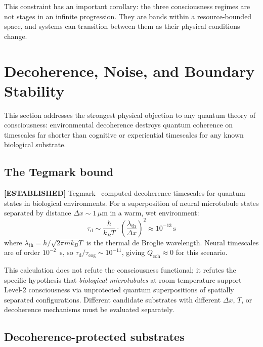 \documentclass[12pt,letterpaper]{article}
\newcommand{\ESTABLISHED}[1]{\textcolor{green!50!black}{\textbf{[ESTABLISHED]}} #1}
\newcommand{\Qcoh}{Q_{\mathrm{coh}}}
\newcommand{\taud}{\tau_{\mathrm{d}}}
\newcommand{\taucog}{\tau_{\mathrm{cog}}}
\begin{document}
This constraint has an important corollary: the three consciousness regimes
are not stages in an infinite progression. They are bands within a
resource-bounded space, and systems can transition between them as their
physical conditions change.

\section{Decoherence, Noise, and Boundary Stability}
\label{sec:decoherence}

This section addresses the strongest physical objection to any quantum theory
of consciousness: environmental decoherence destroys quantum coherence on
timescales far shorter than cognitive or experiential timescales for any
known biological substrate.

\subsection{The Tegmark bound}
\label{sec:tegmark}

\ESTABLISHED{} Tegmark~\cite{Tegmark2000} computed decoherence timescales for
quantum states in biological environments. For a superposition of neural
microtubule states separated by distance $\Delta x \sim 1\,\mu$m in a warm,
wet environment:
\begin{equation}
  \taud \sim \frac{\hbar}{k_B T} \cdot \left(\frac{\lambda_{\mathrm{th}}}{\Delta x}\right)^2
  \approx 10^{-13}\,\mathrm{s}
  \label{eq:tegmark_bound}
\end{equation}
where $\lambda_{\mathrm{th}} = h/\sqrt{2\pi m k_B T}$ is the thermal de
Broglie wavelength. Neural timescales are of order $10^{-2}$~s, so
$\taud / \taucog \sim 10^{-11}$, giving $\Qcoh \approx 0$ for this scenario.

This calculation does not refute the consciousness functional; it refutes the
specific hypothesis that \emph{biological microtubules} at room temperature
support Level-2 consciousness via unprotected quantum superpositions of
spatially separated configurations. Different candidate substrates with
different $\Delta x$, $T$, or decoherence mechanisms must be evaluated
separately.

\subsection{Decoherence-protected substrates}
\label{sec:protected}
\end{document}

